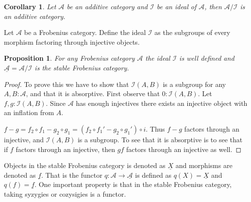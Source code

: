 \documentclass[12pt]{article}
\newtheorem{corollary}{Corollary}[theorem]
\newtheorem{prop}[theorem]{Proposition}
\theoremstyle{definition}
\theoremstyle{remark}
\begin{document}
            \begin{corollary}
                Let $\mathcal{A}$ be an additive category and $\mathcal{I}$ be an ideal of $\mathcal{A}$, then $\mathcal{A}/\mathcal{I}$ is an additive category.
            \end{corollary}

            Let $\mathcal{A}$ be a Frobenius category. Define the ideal $\mathcal{I}$ as the subgroups of every morphism factoring through injective objects.

            \begin{prop}
                For any Frobenius category $\mathcal{A}$ the ideal $\mathcal{I}$ is well defined and $\underline{\mathcal{A}}=\mathcal{A}/\mathcal{I}$ is the stable Frobenius category.
            \end{prop}

            \begin{proof}
                To prove this we have to show that $\mathcal{I}(A,B)$ is a subgroup for any $A,B:\mathcal{A}$, and that it is absorptive.
                First observe that $0:\mathcal{I}(A,B)$. Let $f,g:\mathcal{I}(A,B)$. Since $\mathcal{A}$ has enough injectives there exists an injective object with an inflation from $A$.
                \begin{center}
                \end{center}
                $f-g = f_2 \circ f_1 - g_2 \circ g_1 = (f_2 \circ f_1' - g_2 \circ g_1') \circ i$. Thus $f-g$ factors through an injective, and $\mathcal{I}(A,B)$ is a subgroup.
                To see that it is absorptive is to see that if $f$ factors through an injective, then $gf$ factors through an injective as well.
            \end{proof}

            Objects in the stable Frobenius category is denoted as $\underline{X}$ and morphisms are denoted as $\underline{f}$. That is the functor $q:\mathcal{A}\rightarrow\underline{\mathcal{A}}$ is defined as $q(X)=\underline{X}$ and $q(f)=\underline{f}$. One important property is that in the stable Frobenius category, taking syzygies or cozysigies is a functor.
\end{document}
